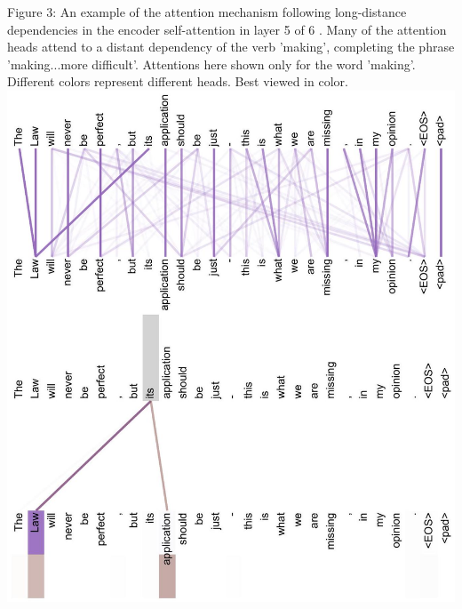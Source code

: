 \documentclass[10pt]{article}
\begin{document}
Figure 3: An example of the attention mechanism following long-distance dependencies in the encoder self-attention in layer 5 of 6 . Many of the attention heads attend to a distant dependency of the verb 'making', completing the phrase 'making...more difficult'. Attentions here shown only for the word 'making'. Different colors represent different heads. Best viewed in color.\\
\includegraphics[max width=\textwidth, center]{2024_11_26_7ad1d7977194ba7a884dg-14}
\end{document}
